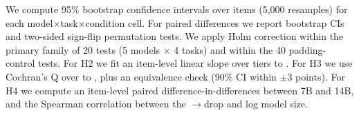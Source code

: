 We compute 95\% bootstrap confidence intervals over items (5{,}000 resamples) for each model$\times$task$\times$condition cell.
For paired differences we report bootstrap CIs and two-sided sign-flip permutation tests.
We apply Holm correction within the primary family of 20 \standard\versus\exhaustive tests (5 models $\times$ 4 tasks) and within the 40 padding-control tests.
For H2 we fit an item-level linear slope over tiers \minimal to \detailed.
For H3 we use Cochran's Q over \concise to \exhaustive, plus an equivalence check (90\% CI within $\pm$3 points).
For H4 we compute an item-level paired difference-in-differences between 7B and 14B, and the Spearman correlation between the \standard$\to$\exhaustive drop and log model size.

